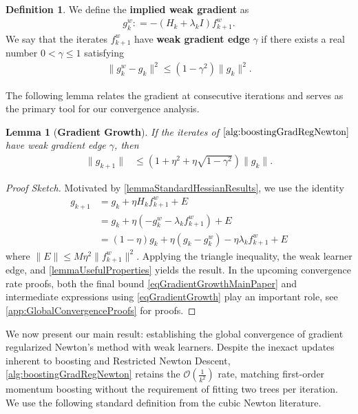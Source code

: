 \documentclass{article}
\theoremstyle{plain}
\newtheorem{lemma}[theorem]{Lemma}
\theoremstyle{definition}
\newtheorem{definition}[theorem]{Definition}
\theoremstyle{remark}
\begin{document}
\begin{definition}\label{defWeakGradientEdge}
    We define the \textbf{implied weak gradient} as
    \begin{align}\label{eqWeakGradient}
        g_k^w : = - (H_k + \lambda_k I)f_{k+1}^w.
    \end{align}
    We say that the iterates $f^w_{k+1}$ have \textbf{weak gradient edge} $\gamma$ if there exists a real number $0<\gamma \leq 1$ satisfying 
    \begin{align}\label{eqWeakGradientEdge}
        \|g_k^w - g_k\|^2 \leq (1-\gamma^2) \|g_k\|^2.
    \end{align}
\end{definition}

The following lemma relates the gradient at consecutive iterations and serves as the primary tool for our convergence analysis.

\begin{lemma}[\textbf{Gradient Growth}]\label{lemmagTProperties}
    If the iterates of $\cref{alg:boostingGradRegNewton}$ have weak gradient edge $\gamma$, then
    \begin{align}\label{eqGradientGrowthMainPaper}
        \|g_{k+1}\|
        &\leq \left(1 + \eta^2 + \eta \sqrt{1-\gamma^2}\right)\|g_k\|.
    \end{align}
\end{lemma}
\begin{proof}[Proof Sketch]
    Motivated by \cref{lemmaStandardHessianResults}, we use the identity
    \begin{align}
        g_{k+1} 
        &= g_k + \eta H_k f^w_{k+1} + E \\
        &= g_k + \eta (-g_k^w-\lambda_k f_{k+1}^w) + E \\
        &= (1-\eta) g_k + \eta(g_k - g_k^w) - \eta \lambda_k f^w_{k+1} + E\label{eqGradientGrowth}
    \end{align}
    where $\|E\| \leq M\eta^2 \|f^w_{k+1}\|^2$. Applying the triangle inequality, the weak learner edge, and \cref{lemmaUsefulProperties} yields the result. In the upcoming convergence rate proofs, both the final bound \eqref{eqGradientGrowthMainPaper} and intermediate expressions using \eqref{eqGradientGrowth} play an important role, see \cref{app:GlobalConvergenceProofs} for proofs.
\end{proof}


We now present our main result: establishing the global convergence of gradient regularized Newton's method with weak learners. Despite the inexact updates inherent to boosting and Restricted Newton Descent, \cref{alg:boostingGradRegNewton} retains the $\mathcal{O}(\frac{1}{k^2})$ rate, matching first-order momentum boosting \cite{2020AcceleratingGradientBoostingMachines} without the requirement of fitting two trees per iteration. We use the following standard definition from the cubic Newton literature.
\end{document}
